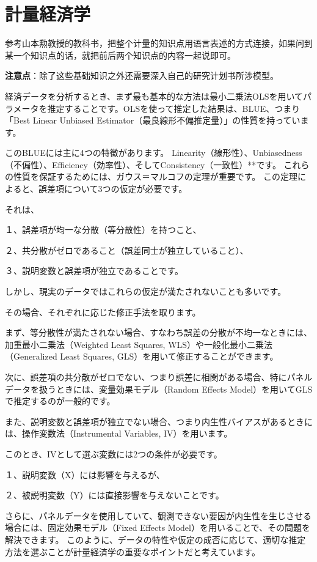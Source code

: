 \documentclass[xelatex,a4paper,base=11pt,ja=standard,jafont=noto]{bxjsreport}
\begin{document}
\section{計量経済学}
参考山本勲教授的教科书，把整个计量的知识点用语言表述的方式连接，如果问到某一个知识点的话，就把前后两个知识点的内容一起说即可。
\par \textbf{注意点}：除了这些基础知识之外还需要深入自己的研究计划书所涉模型。
\par 経済データを分析するとき、まず最も基本的な方法は最小二乗法OLSを用いてパラメータを推定することです。OLSを使って推定した結果は、BLUE、つまり「Best Linear Unbiased Estimator（最良線形不偏推定量）」の性質を持っています。
\par このBLUEには主に4つの特徴があります。
Linearity（線形性）、Unbiasedness（不偏性）、Efficiency（効率性）、そしてConsistency（一致性）**です。
これらの性質を保証するためには、ガウス＝マルコフの定理が重要です。
この定理によると、誤差項について3つの仮定が必要です。
\par それは、
\par １、誤差項が均一な分散（等分散性）を持つこと、
\par ２、共分散がゼロであること（誤差同士が独立していること）、
\par ３、説明変数と誤差項が独立であることです。
\par しかし、現実のデータではこれらの仮定が満たされないことも多いです。
\par その場合、それぞれに応じた修正手法を取ります。
\par まず、等分散性が満たされない場合、すなわち誤差の分散が不均一なときには、加重最小二乗法（Weighted Least Squares, WLS）や一般化最小二乗法（Generalized Least Squares, GLS）を用いて修正することができます。
\par 次に、誤差項の共分散がゼロでない、つまり誤差に相関がある場合、特にパネルデータを扱うときには、変量効果モデル（Random Effects Model）を用いてGLSで推定するのが一般的です。
\par また、説明変数と誤差項が独立でない場合、つまり内生性バイアスがあるときには、操作変数法（Instrumental Variables, IV）を用います。
\par このとき、IVとして選ぶ変数には2つの条件が必要です。
\par １、説明変数（X）には影響を与えるが、
\par ２、被説明変数（Y）には直接影響を与えないことです。
\par さらに、パネルデータを使用していて、観測できない要因が内生性を生じさせる場合には、固定効果モデル（Fixed Effects Model）を用いることで、その問題を解決できます。
このように、データの特性や仮定の成否に応じて、適切な推定方法を選ぶことが計量経済学の重要なポイントだと考えています。
\newpage
\end{document}
